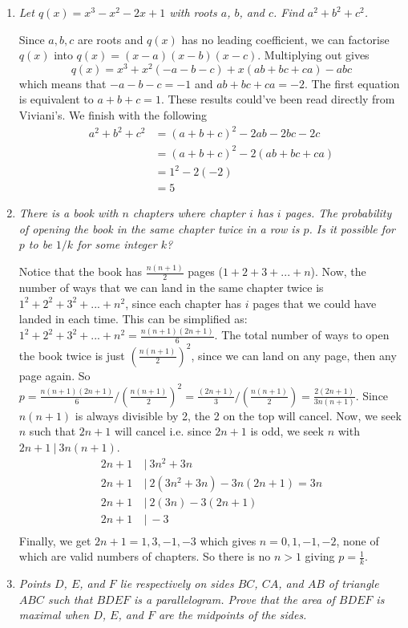 \documentclass{article}
\begin{document}
\begin{enumerate}[1.]
\item %
{\itshape Let $q(x) = x^3 -x^2 -2x +1$ with roots $a$, $b$, and $c$.
Find $a^2 +b^2 + c^2$.}

Since $a,b,c$ are roots and $q(x)$ has no leading coefficient, we can factorise $q(x)$ into $q(x) = (x - a)(x - b)(x - c)$. Multiplying out gives $$q(x) = x^3 + x^2(-a - b - c) + x(ab + bc + ca) - abc$$ which means that $-a -b -c = -1$ and $ab + bc + ca = -2$. The first equation is equivalent to $a + b + c = 1$. These results could've been read directly from Viviani's. We finish with the following
\begin{align*}
a^2 + b^2 + c^2 &= (a + b + c)^2 - 2ab -2bc -2c\\
&= (a + b + c)^2 - 2(ab + bc + ca)\\
&= 1^2 -2(-2)\\
&= 5
\end{align*}


\item %
{\itshape There is a book with $n$ chapters where chapter $i$ has $i$ pages.
The probability of opening the book in the same chapter twice in a row is $p$.
Is it possible for $p$ to be $1/k$ for some integer $k$?}

Notice that the book has $\frac{n(n+1)}{2}$ pages ($1+2+3+...+n$). Now, the number of ways that we can land in the same chapter twice is $1^2+2^2+3^2+...+n^2$, since each chapter has $i$ pages that we could have landed in each time. This can be simplified as: $1^2+2^2+3^2+...+n^2 = \frac{n(n+1)(2n+1)}{6}$. The total number of ways to open the book twice is just $(\frac{n(n+1)}{2})^2$, since we can land on any page, then any page again. So $p = \frac{n(n+1)(2n+1)}{6}/(\frac{n(n+1)}{2})^2 = \frac{(2n+1)}{3}/(\frac{n(n+1)}{2})=\frac{2(2n+1)}{3n(n+1)}$. Since $n(n+1)$ is always divisible by 2, the 2 on the top will cancel. Now, we seek $n$ such that $2n+1$ will cancel i.e. since $2n+1$ is odd, we seek $n$ with $2n+1\:|\: 3n(n+1)$.
\begin{align*}
2n+1\:&|\: 3n^2+3n\\
2n+1\:&|\: 2(3n^2+3n)-3n(2n+1) = 3n\\
2n+1\:&|\: 2(3n)-3(2n+1)\\
2n+1\:&|\: -3\\
\end{align*}
Finally, we get $2n+1=1,3,-1,-3$ which gives $n=0,1,-1,-2$, none of which are valid numbers of chapters. So there is no $n>1$ giving $p=\frac{1}{k}$.


\item %
{\itshape Points $D$, $E$, and $F$ lie respectively on sides $BC$, $CA$, and $AB$ of triangle $ABC$ such that $BDEF$ is a parallelogram. Prove that the area of $BDEF$ is maximal when $D$, $E$, and $F$ are the midpoints of the sides.}


\end{enumerate}
\end{document}
